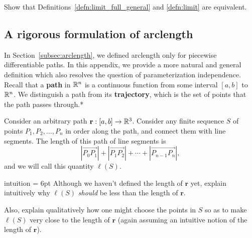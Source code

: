 \documentclass[prettycode,shellescape]{watsonbook}
\begin{document}


\begin{exercise}{}{}
  Show that Definitions~\ref{defn:limit_full_general} and
  \ref{defn:limit} are equivalent.
\end{exercise} \enlargethispage{1cm}

\subsection{A rigorous formulation of arclength}
\label{sec:arclengthappendix}

In Section~\ref{subsec:arclength}, we defined arclength only for
piecewise differentiable paths. In this appendix, we provide a more
natural and general definition which also resolves the question of
parameterization independence. Recall that a \textbf{path} in $\mathbb{R}^n$
is a continuous function from some interval $[a,b]$ to $\mathbb{R}^n$. We
distinguish a path from its \textbf{trajectory}, which is the set of
points that the path passes through.* 

Consider an arbitrary path $\mathbf{r}:[a,b] \to \mathbb{R}^3$. Consider any
finite sequence $S$ of points $P_1, P_2, \ldots, P_n$ in order along
the path, and connect them with line segments. The length of this path
of line segments is
\[
  |\overrightarrow{P_0P_1}| +
  |\overrightarrow{P_1P_2}| + \cdots +
  |\overrightarrow{P_{n-1}P_n}|, 
\]
and we will call this quantity $\ell(S)$.

\begin{exercise}{}{intuition} \parskip = 6pt 
  Although we haven't defined the length of $\mathbf{r}$ yet, explain
  intuitively why $\ell(S)$ \textit{should} be less than the length of
  $\mathbf{r}$.

  Also, explain qualitatively how one might choose the points in $S$
  so as to make $\ell(S)$ very close to the length of $\mathbf{r}$
  (again assuming an intuitive notion of the length of $\mathbf{r}$).
\end{exercise}
\end{document}
